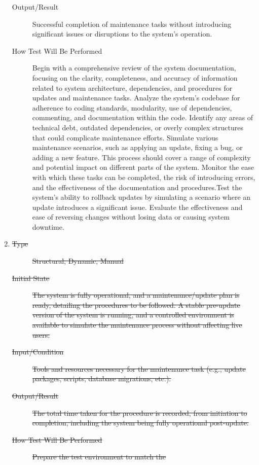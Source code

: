\documentclass[12pt, titlepage]{article}
\begin{document}
\begin{enumerate}[NFR-T1]
\begin{description}
  \item[Output/Result] Successful completion of maintenance tasks without
    introducing significant issues or disruptions to the system's operation.
  \item[How Test Will Be Performed] Begin with a comprehensive review of the
    system documentation, focusing on the clarity, completeness, and accuracy of
    information related to system architecture, dependencies, and procedures for
    updates and maintenance tasks. Analyze the system's codebase for adherence
    to coding standards, modularity, use of dependencies, commenting, and
    documentation within the code. Identify any areas of technical debt,
    outdated dependencies, or overly complex structures that could complicate
    maintenance efforts. Simulate various maintenance scenarios, such as
    applying an update, fixing a bug, or adding a new feature. This process
    should cover a range of complexity and potential impact on different parts
    of the system. Monitor the ease with which these tasks can be completed, the
    risk of introducing errors, and the effectiveness of the documentation and
    procedures.Test the system’s ability to rollback updates by simulating a
    scenario where an update introduces a significant issue. Evaluate the
    effectiveness and ease of reversing changes without losing data or causing
    system downtime.
  \end{description}
\item \label{NFRT20}
  \begin{description}
  \item[\sout{Type}] \sout{Structural, Dynamic, Manual}
  \item[\sout{Initial State}] \sout{The system is fully operational, and a maintenance/update
    plan is ready, detailing the procedures to be followed. A stable pre-update
    version of the system is running, and a controlled environment is available
    to simulate the maintenance process without affecting live users.}
  \item[\sout{Input/Condition}] \sout{Tools and resources necessary for the maintenance task
    (e.g., update packages, scripts, database migrations, etc.).}
  \item[\sout{Output/Result}] \sout{The total time taken for the procedure is recorded, from
    initiation to completion, including the system being fully operational
    post-update.}
  \item[\sout{How Test Will Be Performed}] \sout{Prepare the test environment to match the
}
\end{description}
\end{enumerate}
\end{document}
